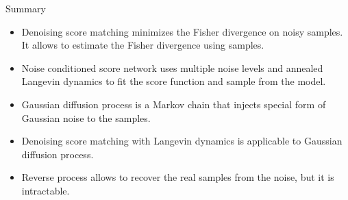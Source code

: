 \begin{frame}{Summary}
	\begin{itemize}
		\item Denoising score matching minimizes the Fisher divergence on noisy samples. It allows to estimate the Fisher divergence using samples.
		\vfill 
		\item Noise conditioned score network uses multiple noise levels and annealed Langevin dynamics to fit the score function and sample from the model.	
		\vfill
		\item Gaussian diffusion process is a Markov chain that injects special form of Gaussian noise to the samples.
		\vfill
		\item Denoising score matching with Langevin dynamics is applicable to Gaussian diffusion process.
		\vfill
		\item Reverse process allows to recover the real samples from the noise, but it is intractable.
	\end{itemize}
\end{frame}
 